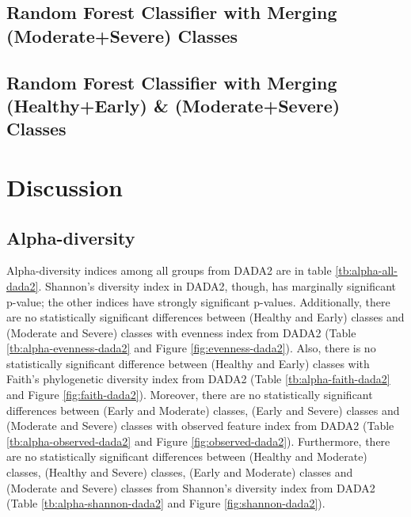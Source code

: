 \documentclass[a4paper]{article}
\begin{document}
        \subsection{Random Forest Classifier with Merging (Moderate+Severe) Classes}

        \subsection{Random Forest Classifier with Merging (Healthy+Early) \& (Moderate+Severe) Classes}

    \section{Discussion}
        \subsection{Alpha-diversity}
            Alpha-diversity indices among all groups from DADA2 are in table \ref{tb:alpha-all-dada2}. Shannon's diversity index in DADA2, though, has marginally significant p-value; the other indices have strongly significant p-values. Additionally, there are no statistically significant differences between (Healthy and Early) classes and (Moderate and Severe) classes with evenness index from DADA2 (Table \ref{tb:alpha-evenness-dada2} and Figure \ref{fig:evenness-dada2}). Also, there is no statistically significant difference between (Healthy and Early) classes with Faith's phylogenetic diversity index from DADA2 (Table \ref{tb:alpha-faith-dada2} and Figure \ref{fig:faith-dada2}). Moreover, there are no statistically significant differences between (Early and Moderate) classes, (Early and Severe) classes and (Moderate and Severe) classes with observed feature index from DADA2 (Table \ref{tb:alpha-observed-dada2} and Figure \ref{fig:observed-dada2}). Furthermore, there are no statistically significant differences between (Healthy and Moderate) classes, (Healthy and Severe) classes, (Early and Moderate) classes and (Moderate and Severe) classes from Shannon's diversity index from DADA2 (Table \ref{tb:alpha-shannon-dada2} and Figure \ref{fig:shannon-dada2}).
\end{document}

